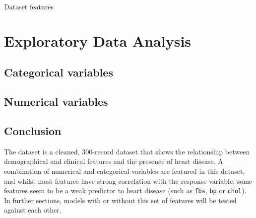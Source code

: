 \begin{table}[h]
    \centering
    
    
    
    \vspace{4pt}
    \caption{Dataset features}
\end{table}

\section{Exploratory Data Analysis}


\subsection{Categorical variables}


\subsection{Numerical variables}


\subsection{Conclusion}
The dataset is a cleaned, 300-record dataset that shows the relationship between demographical and clinical features and the presence of heart disease. A combination of numerical and categorical variables are featured in this dataset, and whilst most features have strong correlation with the response variable, some features seem to be a weak predictor to heart disease (such as \texttt{fbs}, \texttt{bp} or \texttt{chol}). In further sections, models with or without this set of features will be tested against each other.